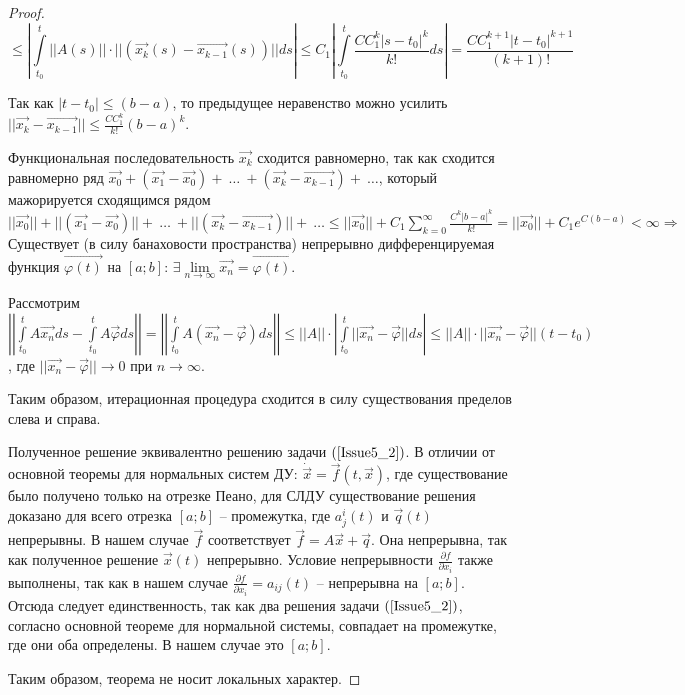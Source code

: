 \begin{proof}
	\[ \leqslant \left| \int\limits_{t_0}^{t} ||A(s)||\cdot ||(\overrightarrow{x_k}(s) - \overrightarrow{x_{k-1}}(s))|| ds \right| \leqslant C_1 \left| \int\limits_{t_0}^{t} \frac{CC_1^k|s-t_0|^k}{k!}ds \right| = \frac{CC_1^{k+1}|t-t_0|^{k+1}}{(k+1)!} \]

	Так как $|t-t_0| \leqslant (b-a)$, то предыдущее неравенство можно усилить $||\overrightarrow{x_k} - \overrightarrow{x_{k-1}}|| \leqslant \frac{CC_1^k}{k!}(b-a)^k.$

	Функциональная последовательность $\overrightarrow{x_k}$ сходится равномерно, так как сходится равномерно ряд $\overrightarrow{x_0} + (\overrightarrow{x_1} - \overrightarrow{x_0}) +\ \dots\ +(\overrightarrow{x_k} - \overrightarrow{x_{k-1}}) +\ \dots$, который мажорируется сходящимся рядом $||\overrightarrow{x_0}|| + ||(\overrightarrow{x_1} - \overrightarrow{x_0})|| +\ \dots\ + ||(\overrightarrow{x_k} - \overrightarrow{x_{k-1}})|| +\ \dots \leqslant ||\overrightarrow{x_0}|| + C_1\sum\limits_{k = 0}^{\infty}\frac{C^k|b-a|^k}{k!} = ||\overrightarrow{x_0}|| + C_1 e^{C(b-a)} < \infty \Rightarrow$ Существует (в силу банаховости пространства) непрерывно дифференцируемая функция $\overrightarrow{\varphi(t)}$ на $[a;b]$: $\exists \lim\limits_{n \rightarrow \infty} \overrightarrow{x_n} = \overrightarrow{\varphi(t)}.$

	Рассмотрим $\left| \left| \int\limits_{t_0}^{t} A\overrightarrow{x_n}ds - \int\limits_{t_0}^{t} A\overrightarrow{\varphi} ds \right| \right| = \left| \left| \int\limits_{t_0}^{t} A(\overrightarrow{x_n} - \overrightarrow{\varphi})ds \right| \right| \leqslant ||A||\cdot \left| \int\limits_{t_0}^{t} ||\overrightarrow{x_n} - \overrightarrow{\varphi}|| ds \right| \leqslant ||A|| \cdot ||\overrightarrow{x_n} - \overrightarrow{\varphi}|| (t - t_0)$, где $||\overrightarrow{x_n} - \overrightarrow{\varphi} || \rightarrow 0$ при $n \rightarrow \infty$.

	Таким образом, итерационная процедура сходится в силу существования пределов слева и справа.

	Полученное решение эквивалентно решению задачи $(\ref{Issue5_2})$. В отличии от основной теоремы для нормальных систем ДУ: $\dot{\overrightarrow{x}} = \overrightarrow{f}(t, \overrightarrow{x})$, где существование было получено только на отрезке Пеано, для СЛДУ существование решения доказано для всего отрезка $[a;b]$ -- промежутка, где $a_j^i(t)$ и $\overrightarrow{q}(t)$ непрерывны. В нашем случае $\overrightarrow{f}$ соответствует $\overrightarrow{f} = A\overrightarrow{x} + \overrightarrow{q}$. Она непрерывна, так как полученное решение $\overrightarrow{x}(t)$ непрерывно. Условие непрерывности $\frac{\partial f}{\partial x_i}$ также выполнены, так как в нашем случае $\frac{\partial f}{\partial x_i} = a_{ij}(t)$ -- непрерывна на $[a;b]$. Отсюда следует единственность, так как два решения задачи $(\ref{Issue5_2})$, согласно основной теореме для нормальной системы, совпадает на промежутке, где они оба определены. В нашем случае это $[a;b]$.

	Таким образом, теорема не носит локальных характер.
\end{proof}
